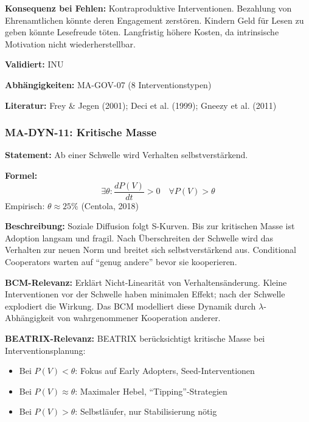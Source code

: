 \textbf{Konsequenz bei Fehlen:}
Kontraproduktive Interventionen. Bezahlung von Ehrenamtlichen könnte deren Engagement zerstören. Kindern Geld für Lesen zu geben könnte Lesefreude töten. Langfristig höhere Kosten, da intrinsische Motivation nicht wiederherstellbar.

\textbf{Validiert:} INU

\textbf{Abhängigkeiten:} MA-GOV-07 (8 Interventionstypen)

\textbf{Literatur:} Frey \& Jegen (2001); Deci et al. (1999); Gneezy et al. (2011)


\subsubsection*{MA-DYN-11: Kritische Masse}

\textbf{Statement:} Ab einer Schwelle wird Verhalten selbstverstärkend.

\textbf{Formel:}
\begin{equation}
\exists \theta: \frac{dP(V)}{dt} > 0 \quad \forall P(V) > \theta
\end{equation}
Empirisch: $\theta \approx 25\%$ (Centola, 2018)

\textbf{Beschreibung:}
Soziale Diffusion folgt S-Kurven. Bis zur kritischen Masse ist Adoption langsam und fragil. Nach Überschreiten der Schwelle wird das Verhalten zur neuen Norm und breitet sich selbstverstärkend aus. Conditional Cooperators warten auf ``genug andere'' bevor sie kooperieren.

\textbf{BCM-Relevanz:}
Erklärt Nicht-Linearität von Verhaltensänderung. Kleine Interventionen vor der Schwelle haben minimalen Effekt; nach der Schwelle explodiert die Wirkung. Das BCM modelliert diese Dynamik durch $\lambda$-Abhängigkeit von wahrgenommener Kooperation anderer.

\textbf{BEATRIX-Relevanz:}
BEATRIX berücksichtigt kritische Masse bei Interventionsplanung:
\begin{itemize}
    \item Bei $P(V) < \theta$: Fokus auf Early Adopters, Seed-Interventionen
    \item Bei $P(V) \approx \theta$: Maximaler Hebel, ``Tipping''-Strategien
    \item Bei $P(V) > \theta$: Selbstläufer, nur Stabilisierung nötig
\end{itemize}

